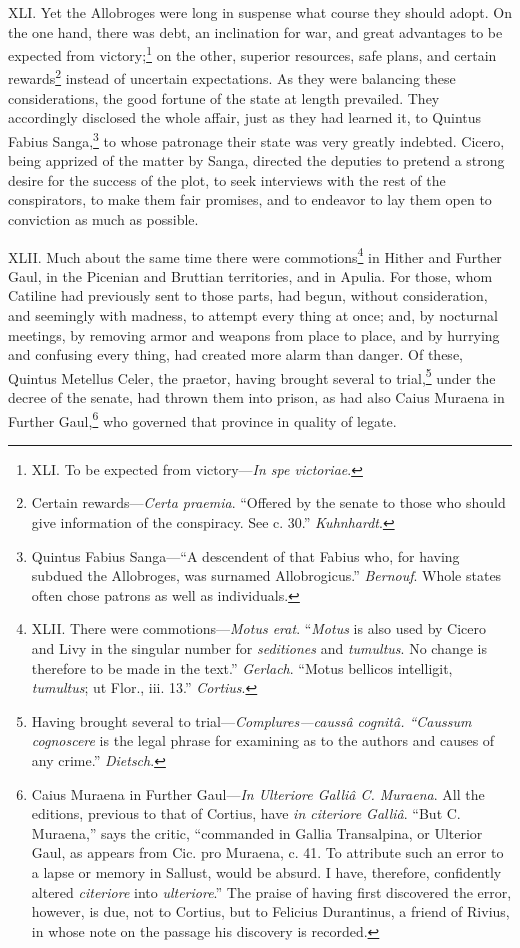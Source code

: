 XLI. Yet the Allobroges were long in suspense what course they should
adopt. On the one hand, there was debt, an inclination for war, and
great advantages to be expected from victory;\footnote{XLI. To be expected from victory—\emph{In spe victoriae}.} on the other,
superior resources, safe plans, and certain rewards\footnote{Certain rewards—\emph{Certa praemia}. ``Offered by the senate to
those who should give information of the conspiracy. See c. 30.''
\emph{Kuhnhardt}.} instead of
uncertain expectations. As they were balancing these considerations,
the good fortune of the state at length prevailed. They accordingly
disclosed the whole affair, just as they had learned it, to Quintus
Fabius Sanga,\footnote{Quintus Fabius Sanga—``A descendent of that Fabius who, for
having subdued the Allobroges, was surnamed Allobrogicus.'' \emph{Bernouf}.
Whole states often chose patrons as well as individuals.} to whose patronage their state was very greatly
indebted. Cicero, being apprized of the matter by Sanga, directed the
deputies to pretend a strong desire for the success of the plot, to
seek interviews with the rest of the conspirators, to make them fair
promises, and to endeavor to lay them open to conviction as much as
possible.

XLII. Much about the same time there were commotions\footnote{XLII. There were commotions—\emph{Motus erat}. ``\emph{Motus} is also
used by Cicero and Livy in the singular number for \emph{seditiones} and
\emph{tumultus}. No change is therefore to be made in the text.'' \emph{Gerlach}.
``Motus bellicos intelligit, \emph{tumultus}; ut Flor., iii. 13.'' \emph{Cortius}.} in Hither
and Further Gaul, in the Picenian and Bruttian territories, and in
Apulia. For those, whom Catiline had previously sent to those parts,
had begun, without consideration, and seemingly with madness, to
attempt every thing at once; and, by nocturnal meetings, by removing
armor and weapons from place to place, and by hurrying and confusing
every thing, had created more alarm than danger. Of these, Quintus
Metellus Celer, the praetor, having brought several to trial,\footnote{Having brought several to trial—\emph{Complures—caussâ cognitâ.
``Caussum cognoscere} is the legal phrase for examining as to the
authors and causes of any crime.'' \emph{Dietsch}.}
under the decree of the senate, had thrown them into prison, as had
also Caius Muraena in Further Gaul,\footnote{Caius Muraena in Further Gaul—\emph{In Ulteriore Galliâ C. Muraena}.
All the editions, previous to that of Cortius, have \emph{in citeriore
Galliâ}. ``But C. Muraena,'' says the critic, ``commanded in Gallia
Transalpina, or Ulterior Gaul, as appears from Cic. pro Muraena,
c. 41. To attribute such an error to a lapse or memory in Sallust,
would be absurd. I have, therefore, confidently altered \emph{citeriore}
into \emph{ulteriore}.'' The praise of having first discovered the error,
however, is due, not to Cortius, but to Felicius Durantinus, a friend
of Rivius, in whose note on the passage his discovery is recorded.} who governed that province in
quality of legate.

